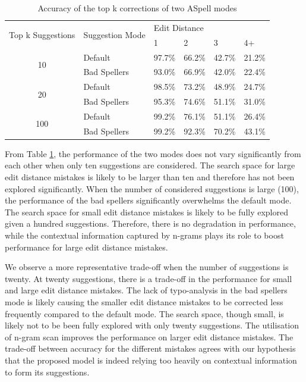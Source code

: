 \documentclass[11pt,a4paper]{article}
\begin{document}
\begin{table}[]
\caption{Accuracy of the top k corrections of two ASpell modes}
\centering
\begin{tabular}{c|l|llll}
\multicolumn{1}{l|}{\multirow{2}{*}{Top k Suggestions}} & \multirow{2}{*}{Suggestion Mode} & \multicolumn{4}{l}{Edit Distance} \\ \cline{3-6} 
\multicolumn{1}{l|}{}                                   &                                  & 1      & 2      & 3      & 4+     \\ \hline
\multirow{2}{*}{10}                                     & Default                          & 97.7\% & 66.2\% & 42.7\% & 21.2\% \\
                                                        & Bad Spellers                     & 93.0\% & 66.9\% & 42.0\% & 22.4\% \\ \hline
\multirow{2}{*}{20}                                     & Default                          & 98.5\% & 73.2\% & 48.9\% & 24.7\% \\
                                                        & Bad Spellers                     & 95.3\% & 74.6\% & 51.1\% & 31.0\% \\ \hline
\multirow{2}{*}{100}                                    & Default                          & 99.2\% & 76.1\% & 51.1\% & 26.4\% \\
                                                        & Bad Spellers                     & 99.2\% & 92.3\% & 70.2\% & 43.1\%
\end{tabular}
\label{Tab:ASpell}   
\end{table}

From Table \ref{Tab:ASpell}, the performance of the two modes does not vary significantly from each other when only ten suggestions are considered. The search space for large edit distance mistakes is likely to be larger than ten and therefore has not been explored significantly. When the number of considered suggestions is large (100), the performance of the bad spellers significantly overwhelms the default mode. The search space for small edit distance mistakes is likely to be fully explored given a hundred suggestions. Therefore, there is no degradation in performance, while the contextual information captured by n-grams plays its role to boost performance for large edit distance mistakes. 

We observe a more representative trade-off when the number of suggestions is twenty. At twenty suggestions, there is a trade-off in the performance for small and large edit distance mistakes. The lack of typo-analysis in the bad spellers mode is likely causing the smaller edit distance mistakes to be corrected less frequently compared to the default mode. The search space, though small, is likely not to be been fully explored with only twenty suggestions. The utilisation of n-gram scan improves the performance on larger edit distance mistakes. The trade-off between accuracy for the different mistakes agrees with our hypothesis that the proposed model is indeed relying too heavily on contextual information to form its suggestions. 
\end{document}
